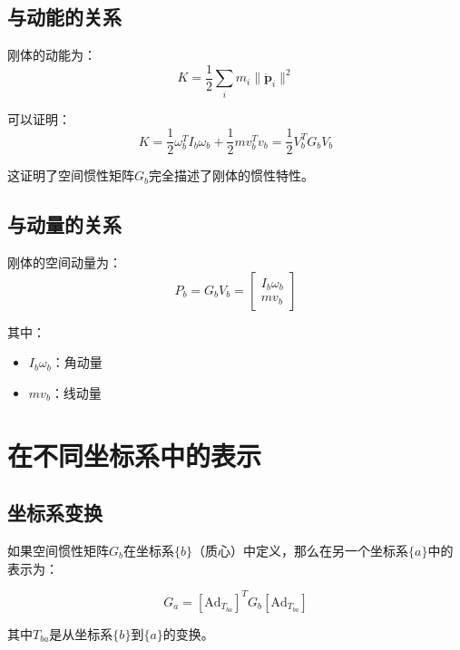 \documentclass[12pt,a4paper]{article}
\begin{document}
\subsection{与动能的关系}

刚体的动能为：
\begin{equation}
K = \frac{1}{2} \sum_i m_i \|\dot{\bm{p}}_i\|^2
\end{equation}

可以证明：
\begin{equation}
K = \frac{1}{2} \omega_b^T I_b \omega_b + \frac{1}{2} m v_b^T v_b = \frac{1}{2} V_b^T G_b V_b
\label{eq:kinetic_energy}
\end{equation}

这证明了空间惯性矩阵$G_b$完全描述了刚体的惯性特性。

\subsection{与动量的关系}

刚体的空间动量为：
\begin{equation}
P_b = G_b V_b = \begin{bmatrix}
I_b \omega_b \\
m v_b
\end{bmatrix}
\label{eq:spatial_momentum}
\end{equation}

其中：
\begin{itemize}
\item $I_b \omega_b$：角动量
\item $m v_b$：线动量
\end{itemize}

\section{在不同坐标系中的表示}

\subsection{坐标系变换}

如果空间惯性矩阵$G_b$在坐标系$\{b\}$（质心）中定义，那么在另一个坐标系$\{a\}$中的表示为：

\begin{equation}
G_a = [\text{Ad}_{T_{ba}}]^T G_b [\text{Ad}_{T_{ba}}]
\label{eq:G_transform}
\end{equation}

其中$T_{ba}$是从坐标系$\{b\}$到$\{a\}$的变换。
\end{document}
